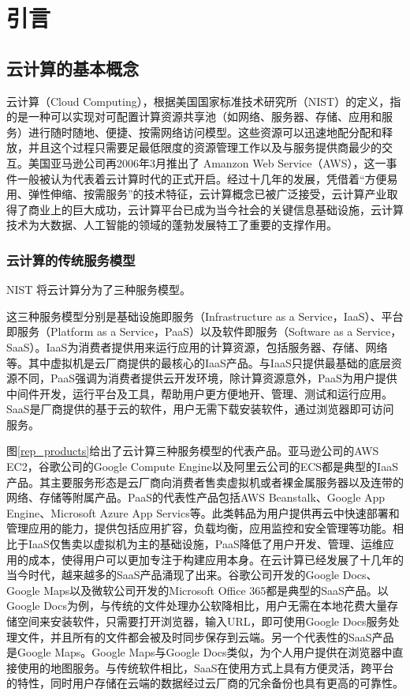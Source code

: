 
\chapter{引言}

\section{云计算的基本概念}

云计算（Cloud Computing），根据美国国家标准技术研究所（NIST）的定义，指的是一种可以实现对可配置计算资源共享池（如网络、服务器、存储、应用和服务）进行随时随地、便捷、按需网络访问模型。这些资源可以迅速地配分配和释放，并且这个过程只需要足最低限度的资源管理工作以及与服务提供商最少的交互。美国亚马逊公司再2006年3月推出了 Amanzon Web Service（AWS），这一事件一般被认为代表着云计算时代的正式开启。经过十几年的发展，凭借着“方便易用、弹性伸缩、按需服务”的技术特征，云计算概念已被广泛接受，云计算产业取得了商业上的巨大成功，云计算平台已成为当今社会的关键信息基础设施，云计算技术为大数据、人工智能的领域的蓬勃发展特工了重要的支撑作用。

\subsection{云计算的传统服务模型}

NIST 将云计算分为了三种服务模型。

这三种服务模型分别是基础设施即服务（Infrastructure as a Service，IaaS）、平台即服务（Platform as a Service，PaaS）以及软件即服务（Software as a Service，SaaS）。IaaS为消费者提供用来运行应用的计算资源，包括服务器、存储、网络等。其中虚拟机是云厂商提供的最核心的IaaS产品。与IaaS只提供最基础的底层资源不同，PaaS强调为消费者提供云开发环境，除计算资源意外，PaaS为用户提供中间件开发，运行平台及工具，帮助用户更方便地开、管理、测试和运行应用。SaaS是厂商提供的基于云的软件，用户无需下载安装软件，通过浏览器即可访问服务。

图\ref{rep_products}给出了云计算三种服务模型的代表产品。亚马逊公司的AWS EC2，谷歌公司的Google Compute Engine以及阿里云公司的ECS都是典型的IaaS产品。其主要服务形态是云厂商向消费者售卖虚拟机或者裸金属服务器以及连带的网络、存储等附属产品。PaaS的代表性产品包括AWS Beanstalk、Google App Engine、Microsoft Azure App Servics等。此类韩品为用户提供再云中快速部署和管理应用的能力，提供包括应用扩容，负载均衡，应用监控和安全管理等功能。相比于IaaS仅售卖以虚拟机为主的基础设施，PaaS降低了用户开发、管理、运维应用的成本，使得用户可以更加专注于构建应用本身。在云计算已经发展了十几年的当今时代，越来越多的SaaS产品涌现了出来。谷歌公司开发的Google Docs、Google Maps以及微软公司开发的Microsoft Office 365都是典型的SaaS产品。以Google Docs为例，与传统的文件处理办公软降相比，用户无需在本地花费大量存储空间来安装软件，只需要打开浏览器，输入URL，即可使用Google Docs服务处理文件，并且所有的文件都会被及时同步保存到云端。另一个代表性的SaaS产品是Google Maps。Google Maps与Google Docs类似，为个人用户提供在浏览器中直接使用的地图服务。与传统软件相比，SaaS在使用方式上具有方便灵活，跨平台的特性，同时用户存储在云端的数据经过云厂商的冗余备份也具有更高的可靠性。

